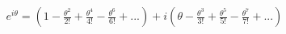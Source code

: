 \documentclass[preview]{standalone}
\begin{document}
\begin{align*}
e^{i\theta} = (1-\frac{\theta^2}{2!}+\frac{\theta^4}{4!}-\frac{\theta^6}{6!}+...) +i (\theta-\frac{\theta^3}{3!}+\frac{\theta^5}{5!}-\frac{\theta^7}{7!}+...)
\end{align*}
\end{document}
